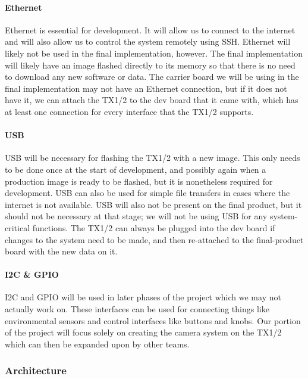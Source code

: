 \documentclass[letterpaper,10pt,serif,draftclsnofoot,onecolumn,compsoc,titlepage]{IEEEtran}
\begin{document}
\paragraph{Ethernet}

Ethernet is essential for development. It will allow us to connect to the internet and 
will also allow us to control the system remotely using SSH. Ethernet will likely not 
be used in the final implementation, however. The final implementation will likely 
have an image flashed directly to its memory so that there is no need to download any 
new software or data. The carrier board we will be using in the final implementation 
may not have an Ethernet connection, but if it does not have it, we can attach the TX1/2 
to the dev board that it came with, which has at least one connection for every 
interface that the TX1/2 supports. \\

\paragraph{USB}

USB will be necessary for flashing the TX1/2 with a new image. This only needs to be 
done once at the start of development, and possibly again when a production image is 
ready to be flashed, but it is nonetheless required for development. USB can also be 
used for simple file transfers in cases where the internet is not available. USB will 
also not be present on the final product, but it should not be necessary at that stage; 
we will not be using USB for any system-critical functions. The TX1/2 can always be 
plugged into the dev board if changes to the system need to be made, and then 
re-attached to the final-product board with the new data on it.\\

\paragraph{I2C \& GPIO}

I2C and GPIO will be used in later phases of the project which we may not actually 
work on. These interfaces can be used for connecting things like environmental sensors 
and control interfaces like buttons and knobs. Our portion of the project will focus 
solely on creating the camera system on the TX1/2 which can then be expanded upon by 
other teams. \\

\subsubsection{Architecture}
\end{document}
